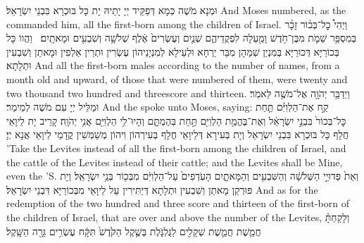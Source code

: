 {וּמְנָא מֹשֶׁה כְּמָא דְּפַקֵּיד יְיָ יָתֵיהּ יָת כָּל בּוּכְרָא בִּבְנֵי יִשְׂרָאֵל׃}
{And Moses numbered, as the \lord\space commanded him, all the first-born among the children of Israel.}{}
{וַיְהִי֩ כׇל־בְּכ֨וֹר זָכָ֜ר בְּמִסְפַּ֥ר שֵׁמֹ֛ת מִבֶּן־חֹ֥דֶשׁ וָמַ֖עְלָה לִפְקֻדֵיהֶ֑ם שְׁנַ֤יִם וְעֶשְׂרִים֙ אֶ֔לֶף שְׁלֹשָׁ֥ה וְשִׁבְעִ֖ים וּמָאתָֽיִם׃ \petucha }
{וַהֲווֹ כָּל בְּכוֹרַיָּא דְּכוּרַיָּא בְּמִנְיַן שְׁמָהָן מִבַּר יַרְחָא וּלְעֵילָא לְמִנְיָנֵיהוֹן עֶשְׂרִין וּתְרֵין אַלְפִין וּמָאתַן וְשִׁבְעִין וּתְלָתָא׃}
{And all the first-born males according to the number of names, from a month old and upward, of those that were numbered of them, were twenty and two thousand two hundred and threescore and thirteen.}{}
{וַיְדַבֵּ֥ר יְהֹוָ֖ה אֶל־מֹשֶׁ֥ה לֵּאמֹֽר׃}
{וּמַלֵּיל יְיָ עִם מֹשֶׁה לְמֵימַר׃}
{And the \lord\space spoke unto Moses, saying:}{}
{קַ֣ח אֶת־הַלְוִיִּ֗ם תַּ֤חַת כׇּל־בְּכוֹר֙ בִּבְנֵ֣י יִשְׂרָאֵ֔ל וְאֶת־בֶּהֱמַ֥ת הַלְוִיִּ֖ם תַּ֣חַת בְּהֶמְתָּ֑ם וְהָיוּ־לִ֥י הַלְוִיִּ֖ם אֲנִ֥י יְהֹוָֽה׃
}
{קָרֵיב יָת לֵיוָאֵי חֲלָף כָּל בּוּכְרָא בִּבְנֵי יִשְׂרָאֵל וְיָת בְּעִירָא דְּלֵיוָאֵי חֲלָף בְּעִירְהוֹן וִיהוֹן מְשַׁמְּשִׁין קֳדָמַי לֵיוָאֵי אֲנָא יְיָ׃}
{’Take the Levites instead of all the first-born among the children of Israel, and the cattle of the Levites instead of their cattle; and the Levites shall be Mine, even the \lord’S.}{}
{וְאֵת֙ פְּדוּיֵ֣י הַשְּׁלֹשָׁ֔ה וְהַשִּׁבְעִ֖ים וְהַמָּאתָ֑יִם הָעֹֽדְפִים֙ עַל־הַלְוִיִּ֔ם מִבְּכ֖וֹר בְּנֵ֥י יִשְׂרָאֵֽל׃
}
{וְיָת פּוּרְקַן מָאתַן וְשִׁבְעִין וּתְלָתָא דְּיַתִּירִין עַל לֵיוָאֵי מִבְּכוֹרַיָּא דִּבְנֵי יִשְׂרָאֵל׃}
{And as for the redemption of the two hundred and three score and thirteen of the first-born of the children of Israel, that are over and above the number of the Levites,}{}
{וְלָקַחְתָּ֗ חֲמֵ֧שֶׁת חֲמֵ֛שֶׁת שְׁקָלִ֖ים לַגֻּלְגֹּ֑לֶת בְּשֶׁ֤קֶל הַקֹּ֙דֶשׁ֙ תִּקָּ֔ח עֶשְׂרִ֥ים גֵּרָ֖ה הַשָּֽׁקֶל׃}
